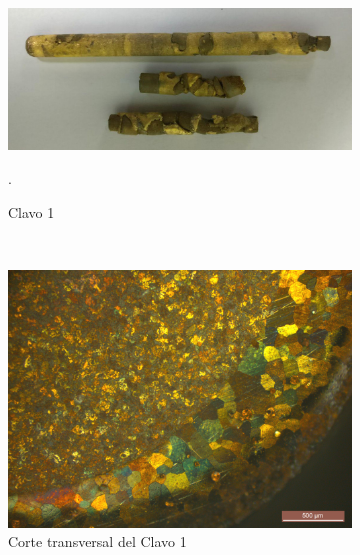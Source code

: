 \documentclass[a4paper,12pt,fleqn,twoside,openany]{book}
\begin{document}
  \begin{figure} \label{fig:Clavo1}
    \centering
    \begin{subfigure}{0.25\textwidth}
        \includegraphics[width=\textwidth]{Img/Resultados/clavos/Clavo1_Foto2.jpg}
	\caption{Clavo 1}. 
	\label{fig: FotoClavo1}
    \end{subfigure}
    ~ %
    \begin{subfigure}{0.25\textwidth}
        \includegraphics[width=\textwidth]{Img/Resultados/clavos/Clavo1.jpg}
        \caption{Corte transversal del Clavo 1}
        \label{fig:MicroClavo1}
    \end{subfigure}
        \begin{subfigure}{0.2\textwidth}

\end{subfigure}
\end{figure}
\end{document}
